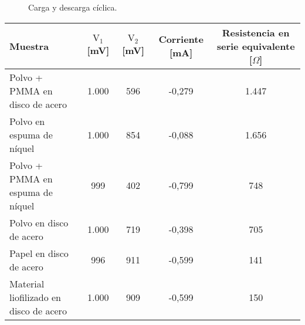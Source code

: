 \begin{figure}[h!]
\begin{subfigure}{0.4\textwidth}
	\end{subfigure}
	\caption{Carga y descarga cíclica.}
	\label{fig:resumen_ccd}
\end{figure}


\begin{table}[h!]
	\begin{tabular}{l c c c c}
			Muestra	&	$\mathrm{V_1}$ [mV]	&	$\mathrm{V_2}$ [mV]	&	Corriente [mA]	&	Resistencia en serie equivalente [$\Omega$]	\\
		\hline
		Polvo + PMMA en disco de acero			&	1.000	&	596	&	-0,279	&	1.447	\\
		Polvo en espuma de níquel				&	1.000	&	854	&	-0,088	&	1.656	\\
		Polvo + PMMA en espuma de níquel		&	999		&	402	&	-0,799	&	748		\\
		Polvo en disco de acero					&	1.000	&	719	&	-0,398	&	705		\\
		Papel en disco de acero					&	996		&	911	&	-0,599	&	141		\\
		Material liofilizado en disco de acero	&	1.000	&	909	&	-0,599	&	150		\\
	\end{tabular}
\end{table}

